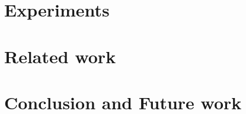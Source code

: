 \documentclass[10pt]{llncs}
\begin{document}
% 

\section{Experiments}
\label{sec:experiments}


\section{Related work}
\label{sec:related}



\section{Conclusion and Future work}
\label{sec:conclusion}






%
\end{document}
